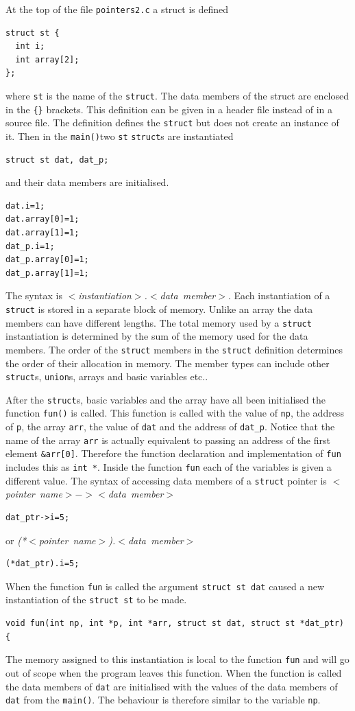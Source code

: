 \documentclass[11pt]{scrartcl}
\def\main{\texttt{main()}}
\begin{document}
At the top of the file \texttt{pointers2.c} a struct is defined
\begin{lstlisting}
struct st {
  int i;
  int array[2];
};
\end{lstlisting}
where \texttt{st} is the name of the \texttt{struct}.  The data
members of the struct are enclosed in the \texttt{\{\}} brackets.  This
definition can be given in a header file instead of in a source file.
The definition defines the \texttt{struct} but does not create an
instance of it.  Then in the \main two \texttt{st} \texttt{struct}s
are instantiated
\begin{lstlisting}
struct st dat, dat_p;
\end{lstlisting}
and their data members are initialised.
\begin{lstlisting}
dat.i=1;
dat.array[0]=1;
dat.array[1]=1;
dat_p.i=1;
dat_p.array[0]=1;
dat_p.array[1]=1;
\end{lstlisting}
The syntax is {\em $<$instantiation$>$.$<$data~member$>$}.  Each instantiation
of a \texttt{struct} is stored in a separate block of memory.  Unlike an array
the data members can have different lengths.  The total memory used by a
\texttt{struct} instantiation is determined by the sum of the memory
used for the data members.  The order of the \texttt{struct} members in
the \texttt{struct} definition determines the order of their allocation in
memory.  The member types can include other \texttt{struct}s,
\texttt{union}s, arrays and basic variables etc..

After the \texttt{struct}s, basic variables and the array have all been
initialised the function \texttt{fun()} is called.  This function is
called with the value of \texttt{np}, the address of \texttt{p}, the
array \texttt{arr}, the value of \texttt{dat} and the address of
\texttt{dat\_p}.  Notice that the name of the array \texttt{arr} is actually
equivalent to passing an address of the first element
\texttt{\&arr[0]}.  Therefore the function declaration and
implementation of \texttt{fun} includes this as \texttt{int~*}.
Inside the function \texttt{fun} each of the variables is given a
different value.  The syntax of accessing data members of a
\texttt{struct} pointer is 
{\em $<$pointer~name$>-><$data~member$>$} 
\begin{lstlisting}
dat_ptr->i=5;
\end{lstlisting}
or 
{\em (*$<$pointer~name$>$).$<$data~member$>$}
\begin{lstlisting}
(*dat_ptr).i=5;
\end{lstlisting}
When the function \texttt{fun} is called the argument
\texttt{struct~st~dat} caused a new instantiation of the
\texttt{struct~st} to be made.
\begin{lstlisting}
void fun(int np, int *p, int *arr, struct st dat, struct st *dat_ptr) {
\end{lstlisting}
The memory assigned to this instantiation is local to the function
\texttt{fun} and will go out of scope when the program leaves this
function.  When the function is called the data members of
\texttt{dat} are initialised with the values of the data members of
\texttt{dat} from the \main.  The behaviour is therefore similar to
the variable \texttt{np}.
\end{document}
